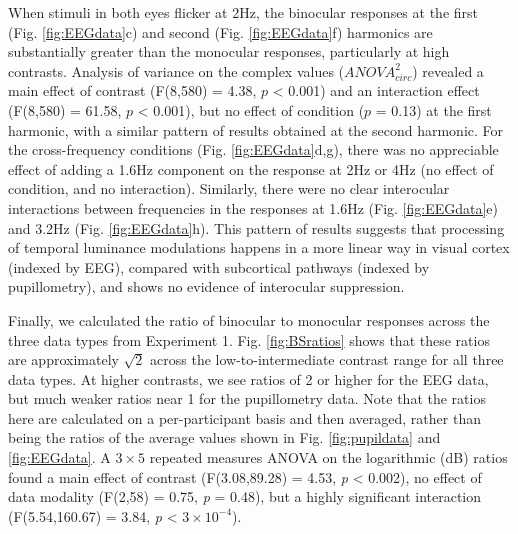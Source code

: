 \documentclass[
]{article}
\begin{document}
When stimuli in both eyes flicker at 2Hz, the binocular responses at the first (Fig. \ref{fig:EEGdata}c) and second (Fig. \ref{fig:EEGdata}f) harmonics are substantially greater than the monocular responses, particularly at high contrasts. Analysis of variance on the complex values (\(ANOVA^2_{circ}\)) revealed a main effect of contrast (F(8,580) = 4.38, \(p\) \textless{} 0.001) and an interaction effect (F(8,580) = 61.58, \(p\) \textless{} 0.001), but no effect of condition (\(p\) = 0.13) at the first harmonic, with a similar pattern of results obtained at the second harmonic. For the cross-frequency conditions (Fig. \ref{fig:EEGdata}d,g), there was no appreciable effect of adding a 1.6Hz component on the response at 2Hz or 4Hz (no effect of condition, and no interaction). Similarly, there were no clear interocular interactions between frequencies in the responses at 1.6Hz (Fig. \ref{fig:EEGdata}e) and 3.2Hz (Fig. \ref{fig:EEGdata}h). This pattern of results suggests that processing of temporal luminance modulations happens in a more linear way in visual cortex (indexed by EEG), compared with subcortical pathways (indexed by pupillometry), and shows no evidence of interocular suppression.

Finally, we calculated the ratio of binocular to monocular responses across the three data types from Experiment 1. Fig. \ref{fig:BSratios} shows that these ratios are approximately \(\sqrt2\) across the low-to-intermediate contrast range for all three data types. At higher contrasts, we see ratios of 2 or higher for the EEG data, but much weaker ratios near 1 for the pupillometry data. Note that the ratios here are calculated on a per-participant basis and then averaged, rather than being the ratios of the average values shown in Fig. \ref{fig:pupildata} and \ref{fig:EEGdata}. A \(3 \times 5\) repeated measures ANOVA on the logarithmic (dB) ratios found a main effect of contrast (F(3.08,89.28) = 4.53, \emph{p} \textless{} 0.002), no effect of data modality (F(2,58) = 0.75, \emph{p} = 0.48), but a highly significant interaction (F(5.54,160.67) = 3.84, \emph{p} \textless{} \ensuremath{3\times 10^{-4}}).
\end{document}
